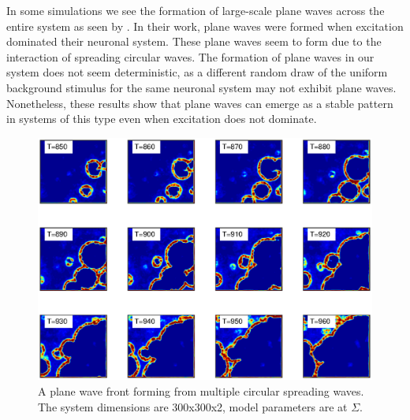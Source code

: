 In some simulations we see the formation of large-scale plane waves across the entire system as seen by \citet{keane2015}.
In their work, plane waves were formed when excitation dominated their neuronal system.
These plane waves seem to form due to the interaction of spreading circular waves.
The formation of plane waves in our system does not seem deterministic, as a different random draw of the uniform background stimulus for the same neuronal system may not exhibit plane waves.
Nonetheless, these results show that plane waves can emerge as a stable pattern in systems of this type even when excitation does not dominate.
\begin{figure}[!htb]
 \caption{ A plane wave front forming from multiple circular spreading waves.
          The system dimensions are 300x300x2, model parameters are at $\Sigma$.
          }
 \label{fig:2D_plane_wave}
 \centering
   \includegraphics[width=\textwidth]{fig/2DPlaneWave}
\end{figure}
\FloatBarrier

